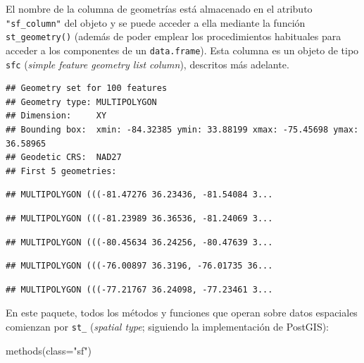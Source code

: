 \documentclass[
  spanish,
]{book}
\newenvironment{Shaded}{\begin{snugshade}}{\end{snugshade}}
\newcommand{\AttributeTok}[1]{\textcolor[rgb]{0.77,0.63,0.00}{#1}}
\newcommand{\CommentTok}[1]{\textcolor[rgb]{0.56,0.35,0.01}{\textit{#1}}}
\newcommand{\FunctionTok}[1]{\textcolor[rgb]{0.00,0.00,0.00}{#1}}
\newcommand{\NormalTok}[1]{#1}
\newcommand{\StringTok}[1]{\textcolor[rgb]{0.31,0.60,0.02}{#1}}
\theoremstyle{break}
\begin{document}
El nombre de la columna de geometrías está almacenado en el atributo \texttt{"sf\_column"} del objeto y se puede acceder a ella mediante la función \texttt{st\_geometry()} (además de poder emplear los procedimientos habituales para acceder a los componentes de un \texttt{data.frame}).
Esta columna es un objeto de tipo \texttt{sfc} (\emph{simple feature geometry list column}), descritos más adelante.

\begin{Shaded}
\end{Shaded}

\begin{verbatim}
## Geometry set for 100 features 
## Geometry type: MULTIPOLYGON
## Dimension:     XY
## Bounding box:  xmin: -84.32385 ymin: 33.88199 xmax: -75.45698 ymax: 36.58965
## Geodetic CRS:  NAD27
## First 5 geometries:
\end{verbatim}

\begin{verbatim}
## MULTIPOLYGON (((-81.47276 36.23436, -81.54084 3...
\end{verbatim}

\begin{verbatim}
## MULTIPOLYGON (((-81.23989 36.36536, -81.24069 3...
\end{verbatim}

\begin{verbatim}
## MULTIPOLYGON (((-80.45634 36.24256, -80.47639 3...
\end{verbatim}

\begin{verbatim}
## MULTIPOLYGON (((-76.00897 36.3196, -76.01735 36...
\end{verbatim}

\begin{verbatim}
## MULTIPOLYGON (((-77.21767 36.24098, -77.23461 3...
\end{verbatim}

En este paquete, todos los métodos y funciones que operan sobre datos espaciales comienzan por \texttt{st\_} (\emph{spatial type}; siguiendo la implementación de PostGIS):

\begin{Shaded}
\begin{Highlighting}[]
\FunctionTok{methods}\NormalTok{(}\AttributeTok{class=}\StringTok{"sf"}\NormalTok{)}
\end{Highlighting}
\end{Shaded}
\end{document}

